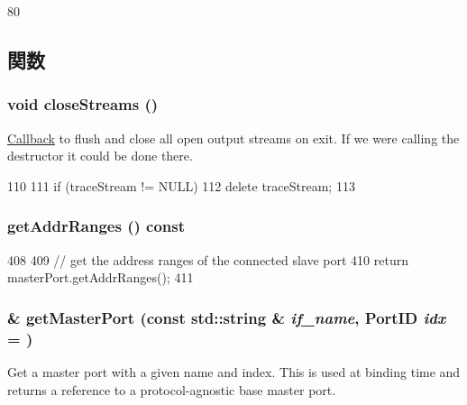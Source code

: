 \begin{DoxyCode}
80 {}
\end{DoxyCode}


\subsection{関数}
\hypertarget{classCommMonitor_a1a9faf3ec2cf5587b9f182041981b72c}{
\subsubsection[{closeStreams}]{\setlength{\rightskip}{0pt plus 5cm}void closeStreams ()}}
\label{classCommMonitor_a1a9faf3ec2cf5587b9f182041981b72c}
\hyperlink{classCallback}{Callback} to flush and close all open output streams on exit. If we were calling the destructor it could be done there. 


\begin{DoxyCode}
110 {
111     if (traceStream != NULL)
112         delete traceStream;
113 }
\end{DoxyCode}
\hypertarget{classCommMonitor_a36cf113d5e5e091ebddb32306c098fae}{
\subsubsection[{getAddrRanges}]{ getAddrRanges () const}}
\label{classCommMonitor_a36cf113d5e5e091ebddb32306c098fae}



\begin{DoxyCode}
408 {
409     // get the address ranges of the connected slave port
410     return masterPort.getAddrRanges();
411 }
\end{DoxyCode}
\hypertarget{classCommMonitor_adc4e675e51defbdd1e354dac729d0703}{
\subsubsection[{getMasterPort}]{ \& getMasterPort (const std::string \& {\em if\_\-name}, \/  {\bf PortID} {\em idx} = {})}}
\label{classCommMonitor_adc4e675e51defbdd1e354dac729d0703}
Get a master port with a given name and index. This is used at binding time and returns a reference to a protocol-\/agnostic base master port.



